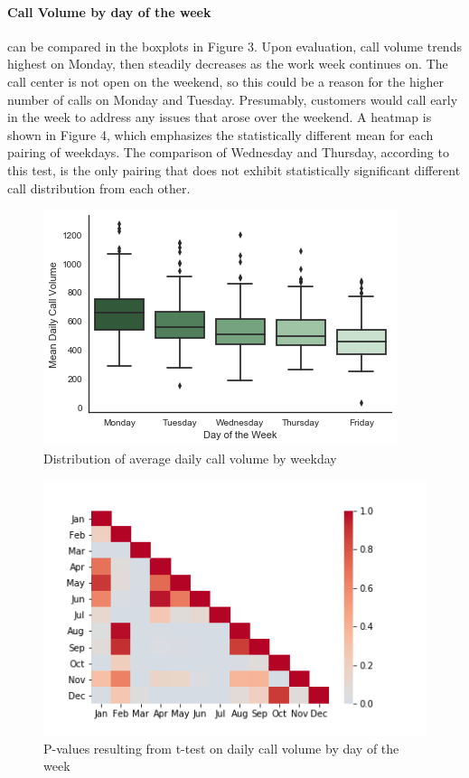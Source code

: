 \documentclass[12pt]{article}
\begin{document}
\paragraph{Call Volume by day of the week} can be compared in the boxplots in Figure 3.  Upon evaluation, call volume trends highest on Monday, then steadily decreases as the work week continues on.  The call center is not open on the weekend, so this could be a reason for the higher number of calls on Monday and Tuesday. Presumably, customers would call early in the week to address any issues that arose over the weekend.  A heatmap is shown in Figure 4, which emphasizes the statistically different mean for each pairing of weekdays.  The comparison of Wednesday and Thursday, according to this test, is the only pairing that does not exhibit statistically significant different call distribution from each other.

	\begin{figure}
	\includegraphics[scale=.4]{Daily_Call_Boxplot.png}
	\caption{Distribution of average daily call volume by weekday}
	\end{figure}

	\begin{figure}
	\includegraphics[scale=.4]{Heatmap.png}
	\caption{P-values resulting from t-test on daily call volume by day of the week}
	\end{figure}
\end{document}
